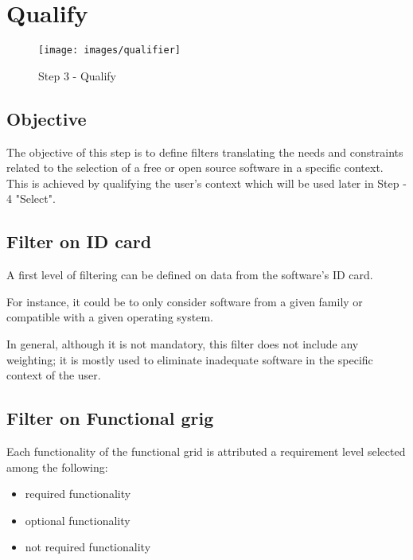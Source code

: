 %
\section{Qualify}
\begin{figure}[h]
\texttt{[image: images/qualifier]}
\caption{Step 3 - Qualify}
\end{figure}

\subsection{Objective}
The objective of this step is to define filters translating the needs and constraints 
related to the selection of a free or open source software in a specific context. 
This is achieved by qualifying the user's context which will be used later in Step - 4 "Select".


\subsection{Filter on ID card}
A first level of filtering can be defined on data from the software's ID card.


For instance, it could be to only consider software from a given family or 
compatible with a given operating system.


In general, although it is not mandatory, this filter does not include 
any weighting; it is mostly used to eliminate inadequate software 
in the specific context of the user.

\subsection{Filter on Functional grig}
Each functionality of the functional grid is attributed a requirement 
level selected among the following:

\begin{itemize}
\item required functionality
\item optional functionality
\item not required functionality
\end{itemize}

